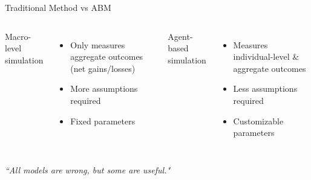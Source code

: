 \documentclass{beamer}
\begin{document}
\begin{frame}{Traditional Method vs ABM}
    \begin{columns}
        Macro-level simulation\\
        \begin{itemize}
            \item Only measures aggregate outcomes (net gains/losses)
            \item More assumptions required
            \item Fixed parameters
        \end{itemize}

        Agent-based simulation\\
        \begin{itemize}
            \item Measures individual-level \& aggregate outcomes
            \item Less assumptions required
            \item Customizable parameters
        \end{itemize}
    \end{columns}

    \bigskip\bigskip
    \textit{``All models are wrong, but some are useful."}

\end{frame}






\end{document}
